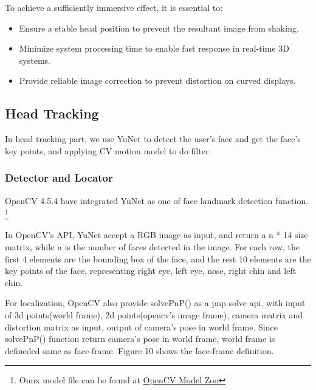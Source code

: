 To achieve a sufficiently immersive effect, it is essential to:
\begin{itemize}
    \item Ensure a stable head position to prevent the resultant image from shaking.
    \item Minimize system processing time to enable fast response in real-time 3D systems.
    \item Provide reliable image correction to prevent distortion on curved displays.
\end{itemize}

\subsection{Head Tracking}
In head tracking part, we use YuNet\cite{Wu_2023} to detect the user's face and get the face's key points, and applying CV motion model to do filter.

\subsubsection{Detector and Locator}
OpenCV 4.5.4\cite{opencv_4_5_4} have integrated YuNet as one of face landmark detection function. \footnote[1]{Onnx model file can be found at \href{https://github.com/opencv/opencv_zoo/tree/main/models/face_detection_yunet}{OpenCV Model Zoo}}


In OpenCV's API, YuNet accept a RGB image as input, and return a n * 14 size matrix, while n is the number of faces detected in the image. For each row, the first 4 elements are the bounding box of the face, and the rest 10 elements are the key points of the face, representing right eye, left eye, nose, right chin and left chin.




For localization, OpenCV also provide solvePnP() as a pnp
 solve api, with input of 3d points(world frame), 2d points(opencv's image frame), camera matrix and distortion matrix as input, output of camera's pose in world frame. Since solvePnP() function return camera's pose in world frame, world frame is defineded same as face-frame. Figure 10 shows the face-frame definition.

